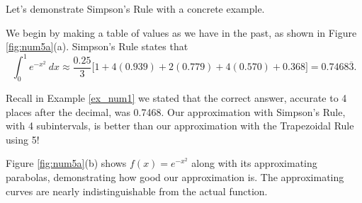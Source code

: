 Let's demonstrate Simpson's Rule with a concrete example.\\

{We begin by making a table of values as we have in the past, as shown in Figure \ref{fig:num5a}(a).
Simpson's Rule states that $$\int_0^1e^{-x^2}\ dx \approx \frac{0.25}{3}\Big[1+4(0.939)+2(0.779)+4(0.570) + 0.368\Big] = 0.7468\overline{3}.$$

Recall in Example \ref{ex_num1} we stated that the correct answer, accurate to 4 places after the decimal, was 0.7468. Our approximation with Simpson's Rule, with 4 subintervals, is better than our approximation with the Trapezoidal Rule using 5!


Figure \ref{fig:num5a}(b) shows $f(x) = e^{-x^2}$ along with its approximating parabolas, demonstrating how good our approximation is. The approximating curves are nearly indistinguishable from the actual function.
}\\

